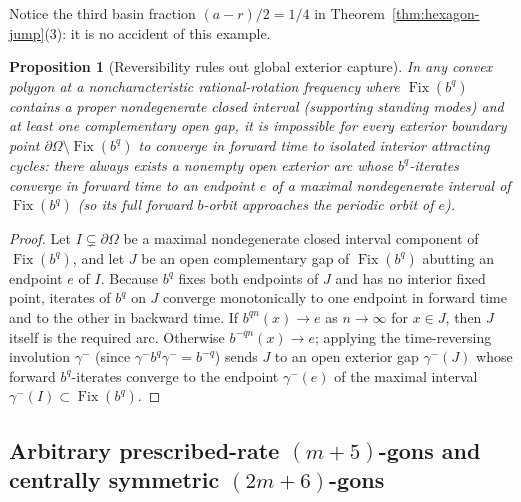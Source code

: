 \documentclass[11pt,reqno]{amsart}
\newtheorem{proposition}[theorem]{Proposition}
\theoremstyle{definition}
\theoremstyle{remark}
\DeclareMathOperator{\Fix}{Fix}
\begin{document}
Notice the third basin fraction $(a-r)/2 = 1/4$ in Theorem~\ref{thm:hexagon-jump}(3): it is no accident of this example.

\begin{proposition}[Reversibility rules out global exterior capture]\label{prop:no-global-capture}
In any convex polygon at a noncharacteristic rational-rotation frequency where $\Fix(b^q)$ contains a proper nondegenerate closed interval (supporting standing modes) and at least one complementary open gap, it is impossible for every exterior boundary point $\partial\Omega \setminus \Fix(b^q)$ to converge in forward time to isolated interior attracting cycles: there always exists a nonempty open exterior arc whose $b^q$-iterates converge in forward time to an endpoint $e$ of a maximal nondegenerate interval of $\Fix(b^q)$ (so its full forward $b$-orbit approaches the periodic orbit of $e$).
\end{proposition}

\begin{proof}
Let $I \subsetneq \partial\Omega$ be a maximal nondegenerate closed interval component of $\Fix(b^q)$, and let $J$ be an open complementary gap of $\Fix(b^q)$ abutting an endpoint $e$ of $I$. Because $b^q$ fixes both endpoints of $J$ and has no interior fixed point, iterates of $b^q$ on $J$ converge monotonically to one endpoint in forward time and to the other in backward time. If $b^{qn}(x) \to e$ as $n \to \infty$ for $x \in J$, then $J$ itself is the required arc. Otherwise $b^{-qn}(x) \to e$; applying the time-reversing involution $\gamma^-$ (since $\gamma^- b^q \gamma^- = b^{-q}$) sends $J$ to an open exterior gap $\gamma^-(J)$ whose forward $b^q$-iterates converge to the endpoint $\gamma^-(e)$ of the maximal interval $\gamma^-(I) \subset \Fix(b^q)$.
\end{proof}

\subsection{Arbitrary prescribed-rate \texorpdfstring{$(m+5)$}{(m+5)}-gons and centrally symmetric \texorpdfstring{$(2m+6)$}{(2m+6)}-gons}
\end{document}
